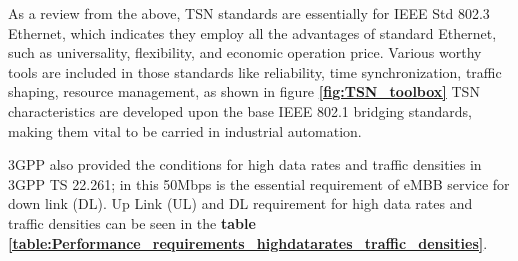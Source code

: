 As a review from the above, TSN standards are essentially for IEEE Std 802.3 Ethernet, which indicates they employ all the advantages of standard Ethernet, such as universality, flexibility, and economic operation price.
Various worthy tools are included in those standards like reliability, time synchronization, traffic shaping, resource management, as shown in figure
\textbf{\ref{fig:TSN_toolbox}}
TSN characteristics are developed upon the base IEEE 802.1 bridging standards, making them vital to be carried in industrial automation.


3GPP also provided the conditions for high data rates and traffic densities in 3GPP TS 22.261\cite{5G_Ser_req_nex_gen2018study}; in this 50Mbps is the essential requirement of eMBB service for down link (DL). Up Link (UL) and DL requirement for high data rates and traffic densities can be seen in the \textbf{table}
\textbf{\ref{table:Performance_requirements_highdatarates_traffic_densities}}. 
 



  




